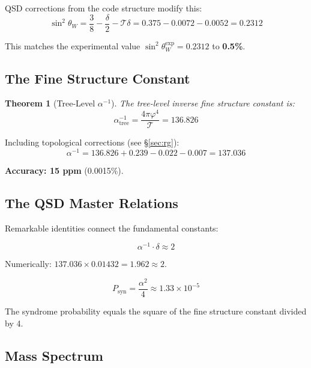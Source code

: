 \documentclass[11pt,a4paper]{article}
\newtheorem{theorem}{Theorem}[section]
\theoremstyle{definition}
\newcommand{\Tc}{\mathcal{T}}           %
\newcommand{\dgeo}{\delta}              %
\newcommand{\Psyn}{P_{\text{syn}}}      %
\begin{document}
QSD corrections from the code structure modify this:
\begin{equation}
\sin^2\theta_W = \frac{3}{8} - \frac{\dgeo}{2} - \Tc\dgeo = 0.375 - 0.0072 - 0.0052 = 0.2312
\end{equation}

This matches the experimental value $\sin^2\theta_W^{\text{exp}} = 0.2312$ to \textbf{0.5\%}.

\subsection{The Fine Structure Constant}

\begin{theorem}[Tree-Level $\alpha^{-1}$]
The tree-level inverse fine structure constant is:
\begin{equation}
\alpha^{-1}_{\text{tree}} = \frac{4\pi\varphi^4}{\Tc} = 136.826
\end{equation}
\end{theorem}

Including topological corrections (see \S\ref{sec:rg}):
\begin{equation}
\alpha^{-1} = 136.826 + 0.239 - 0.022 - 0.007 = 137.036
\end{equation}

\textbf{Accuracy: 15 ppm} (0.0015\%).

\subsection{The QSD Master Relations}

Remarkable identities connect the fundamental constants:

\begin{equation}
\boxed{\alpha^{-1} \cdot \dgeo \approx 2}
\end{equation}

Numerically: $137.036 \times 0.01432 = 1.962 \approx 2$.

\begin{equation}
\boxed{\Psyn = \frac{\alpha^2}{4} \approx 1.33 \times 10^{-5}}
\end{equation}

The syndrome probability equals the square of the fine structure constant divided by 4.

\subsection{Mass Spectrum}
\end{document}
